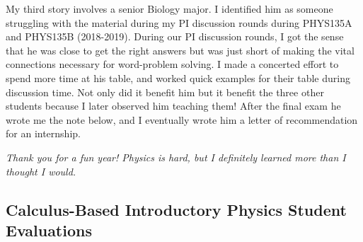 \documentclass[../../main.tex]{subfiles}
\begin{document}
My third story involves a senior Biology major.  I identified him as someone struggling with the material during my PI discussion rounds during PHYS135A and PHYS135B (2018-2019).  During our PI discussion rounds, I got the sense that he was close to get the right answers but was just short of making the vital connections necessary for word-problem solving.  I made a concerted effort to spend more time at his table, and worked quick examples for their table during discussion time.  Not only did it benefit him but it benefit the three other students because I later observed him teaching them!  After the final exam he wrote me the note below, and I eventually wrote him a letter of recommendation for an internship. \\ \hspace{0.1cm}

\textit{Thank you for a fun year!  Physics is hard, but I definitely learned more than I thought I would.} \\ \hspace{0.1cm}

\subsection{Calculus-Based Introductory Physics Student Evaluations}
\end{document}

